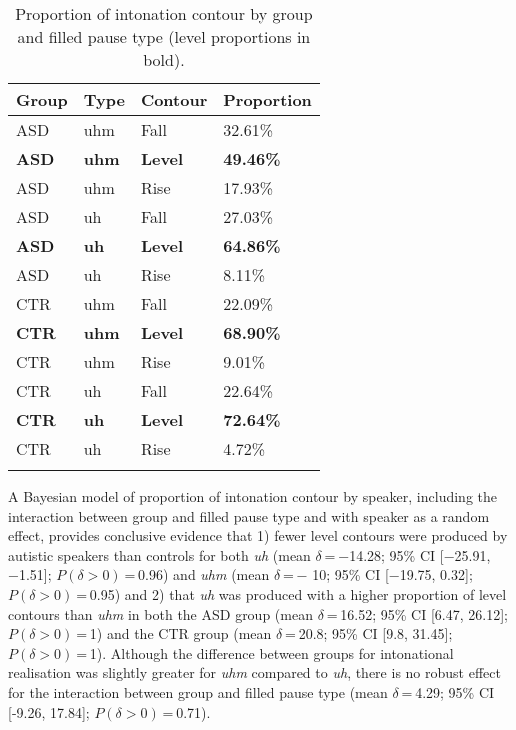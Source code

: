 \begin{table}
			
    \caption{\label{tab:FPlevel}Proportion of intonation contour by group and filled pause type (level proportions in bold).}

    \begin{tabular}{llll}
	    \lsptoprule
	    Group        & Type         & Contour        & Proportion\\
	    \midrule
	    ASD          & uhm          & Fall           & 32.61\%\\
	    \textbf{ASD} & \textbf{uhm} & \textbf{Level} & \textbf{49.46\%}\\
	    ASD          & uhm          & Rise           & 17.93\%\\
	    ASD          & uh           & Fall           & 27.03\%\\
	    \textbf{ASD} & \textbf{uh}  & \textbf{Level} & \textbf{64.86\%}\\
	    ASD          & uh           & Rise           & 8.11\%\\
	    CTR          & uhm          & Fall           & 22.09\%\\
	    \textbf{CTR} & \textbf{uhm} & \textbf{Level} & \textbf{68.90\%}\\
	    CTR          & uhm          & Rise           & 9.01\%\\
	    CTR          & uh           & Fall           & 22.64\%\\
	    \textbf{CTR} & \textbf{uh}  & \textbf{Level} & \textbf{72.64\%}\\
	    CTR          & uh           & Rise           & 4.72\%\\
	    \lspbottomrule
    \end{tabular}

\end{table}

A Bayesian model of proportion of intonation contour by speaker, including the interaction between group and filled pause type and with speaker as a random effect, provides conclusive evidence that 1) fewer level contours were produced by autistic speakers than controls for both \emph{uh} (mean \(\delta\) = −14.28; 95\% CI {[}−25.91, −1.51{]}; \(P(\delta > 0)\) = 0.96) and  \emph{uhm} (mean \(\delta\) = − 10; 95\% CI {[}−19.75, 0.32{]}; \(P(\delta > 0)\) = 0.95) and 2) that \emph{uh} was produced with a higher proportion of level contours than \emph{uhm} in both the ASD group (mean \(\delta\) = 16.52; 95\% CI {[}6.47, 26.12{]}; \(P(\delta > 0)\) = 1) and the CTR group (mean \(\delta\) = 20.8; 95\% CI {[}9.8, 31.45{]}; \(P(\delta > 0)\) = 1). Although the difference between groups for intonational realisation was slightly greater for \emph{uhm} compared to \emph{uh}, there is no robust effect for the interaction between group and filled pause type (mean \(\delta\) = 4.29; 95\% CI {[}-9.26, 17.84{]}; \(P(\delta > 0)\) = 0.71).

